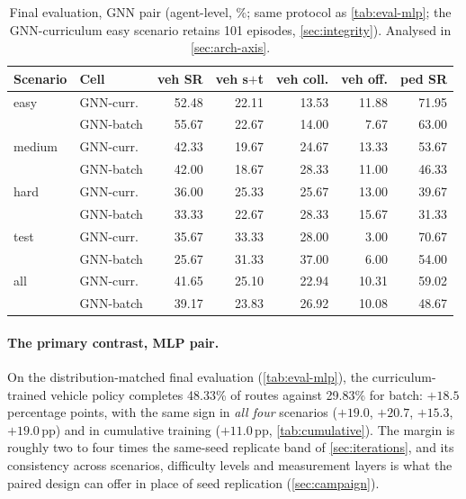 \begin{table}[t]
  \centering\small
  \caption{Final evaluation, GNN pair (agent-level, \%; same protocol as
  \cref{tab:eval-mlp}; the GNN-curriculum easy scenario retains 101
  episodes, \cref{sec:integrity}). Analysed in \cref{sec:arch-axis}.}
  \label{tab:eval-gnn}
  \begin{tabular}{@{}llrrrrr@{}}
    \toprule
    Scenario & Cell & veh SR & veh s$+$t & veh coll. & veh off. & ped SR \\
    \midrule
    easy   & GNN-curr.\ & 52.48 & 22.11 & 13.53 & 11.88 & 71.95 \\
           & GNN-batch  & 55.67 & 22.67 & 14.00 & 7.67 & 63.00 \\
    medium & GNN-curr.\ & 42.33 & 19.67 & 24.67 & 13.33 & 53.67 \\
           & GNN-batch  & 42.00 & 18.67 & 28.33 & 11.00 & 46.33 \\
    hard   & GNN-curr.\ & 36.00 & 25.33 & 25.67 & 13.00 & 39.67 \\
           & GNN-batch  & 33.33 & 22.67 & 28.33 & 15.67 & 31.33 \\
    test   & GNN-curr.\ & 35.67 & 33.33 & 28.00 & 3.00 & 70.67 \\
           & GNN-batch  & 25.67 & 31.33 & 37.00 & 6.00 & 54.00 \\
    \midrule
    all    & GNN-curr.\ & 41.65 & 25.10 & 22.94 & 10.31 & 59.02 \\
           & GNN-batch  & 39.17 & 23.83 & 26.92 & 10.08 & 48.67 \\
    \bottomrule
  \end{tabular}
\end{table}

\paragraph{The primary contrast, MLP pair.}
On the distribution-matched final evaluation
(\cref{tab:eval-mlp}), the curriculum-trained vehicle policy completes
48.33\% of routes against 29.83\% for batch: $+18.5$ percentage points,
with the same sign in \emph{all four} scenarios ($+19.0$, $+20.7$,
$+15.3$, $+19.0$\,pp) and in cumulative training ($+11.0$\,pp,
\cref{tab:cumulative}). The margin is roughly two to four times the
same-seed replicate band of \cref{sec:iterations}, and its consistency
across scenarios, difficulty levels and measurement layers is what the
paired design can offer in place of seed replication
(\cref{sec:campaign}).

